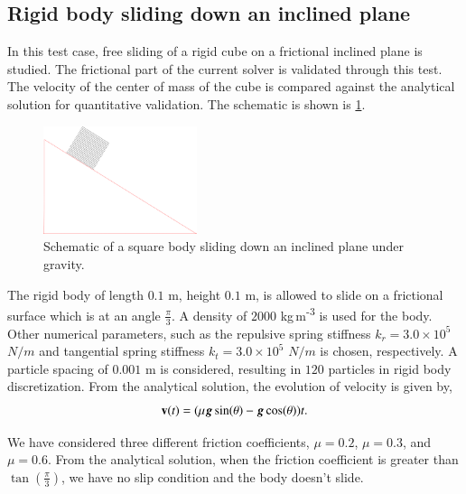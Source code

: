 \subsection{Rigid body sliding down an inclined plane}
\label{sec:rigid-body-sliding}
In this test case, free sliding of a rigid cube on a frictional inclined plane
is studied. The frictional part of the current solver is validated through this
test. The velocity of the center of mass of the cube is compared against the
analytical solution for quantitative validation. The schematic is shown is
\cref{fig:rigid_body_sliding}.
\begin{figure}[!htpb]
  \centering
  \includegraphics[width=0.4\textwidth]{images/rfc/images/rigid_body_sliding/schematic}
  \caption{Schematic of a square body sliding down an inclined plane under gravity.}
\label{fig:rigid_body_sliding}
\end{figure}
The rigid body of length $0.1$ m, height $0.1$ m, is allowed to slide on a
frictional surface which is at an angle $\frac{\pi}{3}$. A density of $2000$
kg\,m\textsuperscript{-3} is used for the body. Other numerical parameters, such
as the repulsive spring stiffness $k_r=3.0 \times 10^{5}$ $N/m$ and tangential
spring stiffness $k_t=3.0 \times 10^{5}$ $N/m$ is chosen, respectively. A
particle spacing of $0.001$ m is considered, resulting in $120$ particles in
rigid body discretization. From the analytical solution, the evolution of
velocity is given by,
\begin{equation}
  \label{eq:ce}
  \mathbf{v}(t) = (\mu \boldsymbol{g} \sin (\theta) - \boldsymbol{g} \cos (\theta)) t.
\end{equation}

We have considered three different friction coefficients, $\mu=0.2$,
$\mu=0.3$, and $\mu=0.6$. From the analytical solution, when the friction
coefficient is greater than $\tan(\frac{\pi}{3})$, we have no slip condition
and the body doesn't slide.

